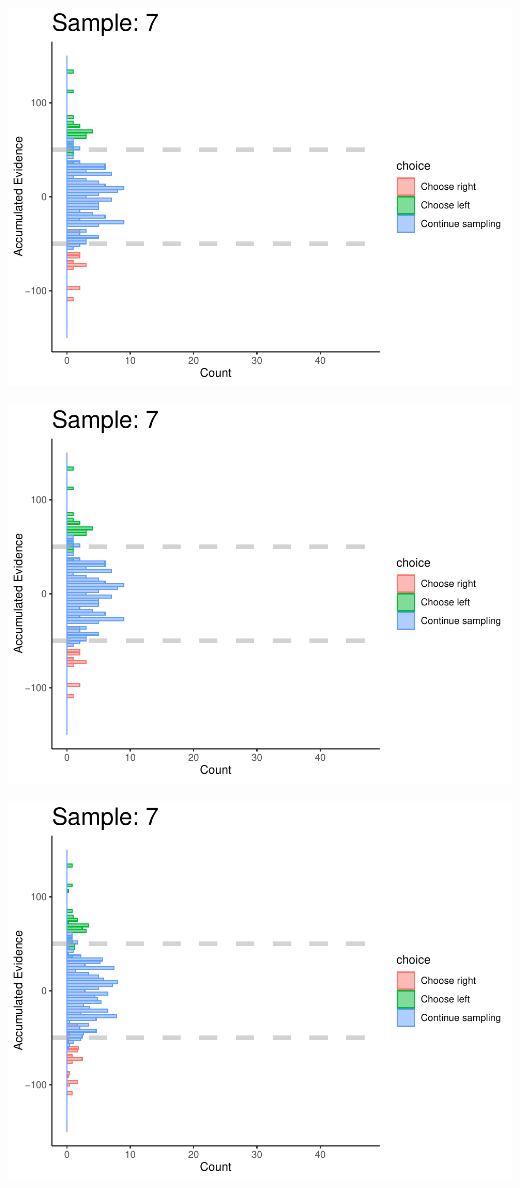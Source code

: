 \documentclass[
]{book}
\begin{document}
\begin{center}\includegraphics[width=0.8\linewidth]{LateNightBayes_files/figure-latex/fixed_check-64} \end{center}

\begin{center}\includegraphics[width=0.8\linewidth]{LateNightBayes_files/figure-latex/fixed_check-65} \end{center}

\begin{center}\includegraphics[width=0.8\linewidth]{LateNightBayes_files/figure-latex/fixed_check-66} \end{center}
\end{document}
